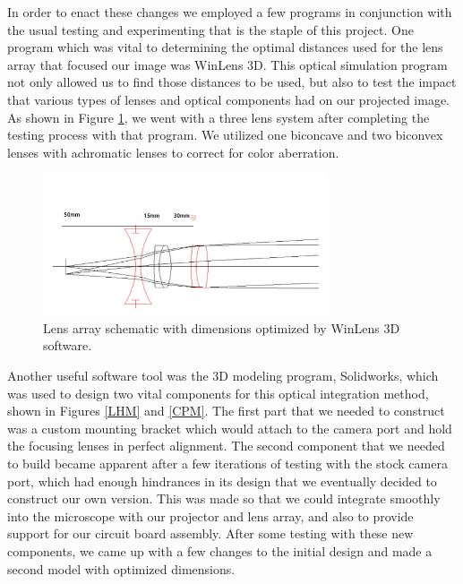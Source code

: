 \documentclass[12pt,a4paper]{article}
\begin{document}
\begin{appendices}
In order to enact these changes we employed a few programs in conjunction with the usual testing and experimenting that is the staple of this project.  One program which was vital to determining the optimal distances used for the lens array that focused our image was WinLens 3D.  This optical simulation program not only allowed us to find those distances to be used, but also to test the impact that various types of lenses and optical components had on our projected image.  As shown in Figure \ref{LAD}, we went with a three lens system after completing the testing process with that program.  We utilized one biconcave and two biconvex lenses with achromatic lenses to correct for color aberration.

\begin{figure}[h]
	\centering
	\includegraphics[width = 0.75\textwidth]{pics/lens_array.jpg}
	\caption[Lens Array Diagram]{\centering Lens array schematic with dimensions optimized by WinLens 3D software.}
	\label{LAD}
\end{figure}

Another useful software tool was the 3D modeling program, Solidworks, which was used to design two vital components for this optical integration method, shown in Figures \ref{LHM} and \ref{CPM}.  The first part that we needed to construct was a custom mounting bracket which would attach to the camera port and hold the focusing lenses in perfect alignment.  The second component that we needed to build became apparent after a few iterations of testing with the stock camera port, which had enough hindrances in its design that we eventually decided to construct our own version.  This was made so that we could integrate smoothly into the microscope with our projector and lens array, and also to provide support for our circuit board assembly.  After some testing with these new components, we came up with a few changes to the initial design and made a second model with optimized dimensions.



\end{appendices}
\end{document}
